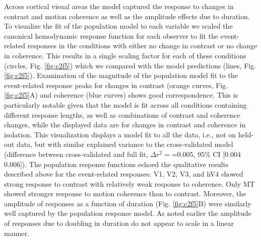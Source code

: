 Across cortical visual areas the model captured the response to changes in contrast and motion coherence as well as the amplitude effects due to duration. To visualize the fit of the population model to each variable we scaled the canonical hemodynamic response function for each observer to fit the event-related responses in the conditions with either no change in contrast or no change in coherence. This results in a single scaling factor for each of these conditions (circles, Fig. \ref{fig:c2f5}) which we compared with the model predictions (lines, Fig. \ref{fig:c2f5}). Examination of the magnitude of the population model fit to the event-related response peaks for changes in contrast (orange curves, Fig. \ref{fig:c2f5}A) and coherence (blue curves) shows good correspondence. This is particularly notable given that the model is fit across all conditions containing different response lengths, as well as combinations of contrast and coherence changes, while the displayed data are for changes in contrast and coherence in isolation. This visualization displays a model fit to all the data, i.e., not on held-out data, but with similar explained variance to the cross-validated model (difference between cross-validated and full fit, $\Delta r^2=$=0.005, 95\% CI [0.004 0.006]). The population response functions echoed the qualitative results described above for the event-related responses: V1, V2, V3, and hV4 showed strong response to contrast with relatively weak response to coherence. Only MT showed stronger response to motion coherence than to contrast. Moreover, the amplitude of responses as a function of duration (Fig. \ref{fig:c2f5}B) were similarly well captured by the population response model. As noted earlier the amplitude of responses due to doubling in duration do not appear to scale in a linear manner.


